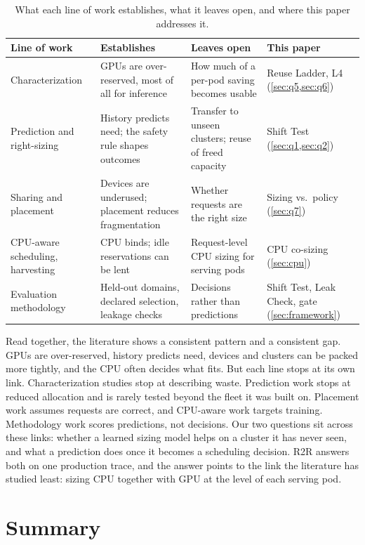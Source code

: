 \documentclass[10pt]{article}
\begin{document}
\begin{table}[t]
\centering\small
\caption{What each line of work establishes, what it leaves open, and where this paper addresses it.}
\label{tab:gaps}
\begin{tabularx}{\linewidth}{@{}P{2.6cm}LLP{2.4cm}@{}}
\toprule
Line of work & Establishes & Leaves open & This paper \\
\midrule
Characterization & GPUs are over-reserved, most of all for inference & How much of a per-pod saving becomes usable & Reuse Ladder, L4 (\cref{sec:q5,sec:q6}) \\
Prediction and right-sizing & History predicts need; the safety rule shapes outcomes & Transfer to unseen clusters; reuse of freed capacity & Shift Test (\cref{sec:q1,sec:q2}) \\
Sharing and placement & Devices are underused; placement reduces fragmentation & Whether requests are the right size & Sizing vs.\ policy (\cref{sec:q7}) \\
CPU-aware scheduling, harvesting & CPU binds; idle reservations can be lent & Request-level CPU sizing for serving pods & CPU co-sizing (\cref{sec:cpu}) \\
Evaluation methodology & Held-out domains, declared selection, leakage checks & Decisions rather than predictions & Shift Test, Leak Check, gate (\cref{sec:framework}) \\
\bottomrule
\end{tabularx}
\end{table}

Read together, the literature shows a consistent pattern and a consistent gap. GPUs are over-reserved, history predicts need, devices and clusters can be packed more tightly, and the CPU often decides what fits. But each line stops at its own link. Characterization studies stop at describing waste. Prediction work stops at reduced allocation and is rarely tested beyond the fleet it was built on. Placement work assumes requests are correct, and CPU-aware work targets training. Methodology work scores predictions, not decisions. Our two questions sit across these links: whether a learned sizing model helps on a cluster it has never seen, and what a prediction does once it becomes a scheduling decision. R2R answers both on one production trace, and the answer points to the link the literature has studied least: sizing CPU together with GPU at the level of each serving pod.

\section{Summary}
\label{sec:conclusion}
\end{document}

